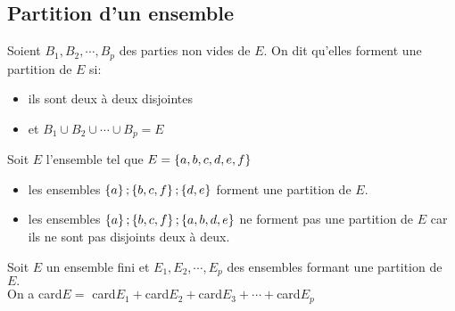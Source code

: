 \subsection*{Partition d'un ensemble}
\begin{definition}
Soient $ B_{1},B_{2}, \cdots, B_{p} $ des  parties non vides de $ E. $  On dit qu'elles forment une partition de $ E $ si:
\begin{itemize}
\item ils sont deux à deux disjointes 
\item  et $B_{1}\cup B_{2}\cup  \cdots\cup B_{p} =E $
\end{itemize}
\end{definition}
\begin{example}
Soit $ E $ l'ensemble tel que $ E= \left\{a, b, c, d, e, f\right\} $
\begin{itemize}
\item[\textbullet] les ensembles  $ \left\{a\right\}; \left\{b, c,  f\right\}; \left\{d,e\right\} $ forment une partition de $ E. $
\item[\textbullet] les ensembles  $ \left\{a\right\}; \left\{b, c,  f\right\}; \left\{a, b,d,e\right\} $ ne  forment pas une partition de $ E$ car ils ne  sont pas disjoints deux à deux.
\end{itemize}
\end{example}
\begin{property}
Soit $ E $ un ensemble fini et  $ E_{1},E_{2}, \cdots, E_{p} $ des ensembles formant une partition de $ E. $ \\
On a card$ E= $ card$ E_{1}+ $card$ E_{2} + $card$ E_{3}+ \cdots + $card$ E_{p} $
\end{property}

